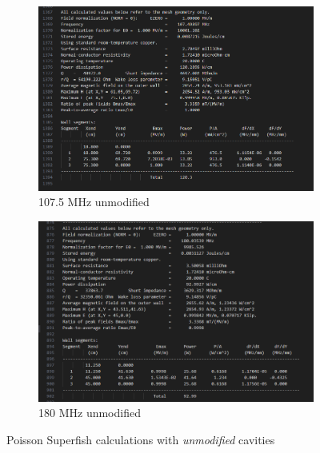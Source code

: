 \documentclass{article}
\begin{document}
\begin{figure}[H]
    \centering
    \begin{subfigure}{.5\textwidth}
      \centering
      \includegraphics[width=0.97\linewidth]{../../../figures/superfish/superfish107_z.png}
      \caption{107.5 MHz unmodified}
    \end{subfigure}%
    \begin{subfigure}{.5\textwidth}
      \centering
      \includegraphics[width=0.99\linewidth]{../../../figures/superfish/superfish180_z}
      \caption{180 MHz unmodified}
    \end{subfigure}
    \caption{Poisson Superfish calculations with \textit{unmodified} cavities}
    \label{fig:107_cavity_shunt_diff}
\end{figure}
    
\end{document}
